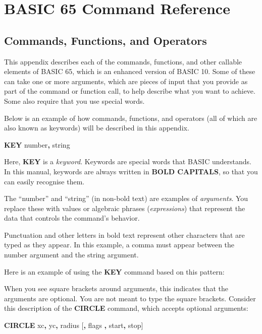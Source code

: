 \hypersetup{bookmarksdepth=2}
\chapter{BASIC 65 Command Reference}
\label{cha:basic-reference}


\section{Commands, Functions, and Operators}

This appendix describes each of the commands, functions, and other callable
elements of BASIC 65, which is an enhanced version of BASIC 10. Some of these
can take one or more arguments, which are pieces of input that you provide as
part of the command or function call, to help describe what you want to achieve.
Some also require that you use special words.

Below is an example of how commands, functions, and operators
(all of which are also known as keywords) will be described in this appendix.

{\bf KEY} number{\bf,} string

Here, {\bf KEY} is a {\em keyword}. Keywords are special words
that BASIC understands. In this manual, keywords are always written in
{\bf BOLD CAPITALS}, so that you can easily recognise them.

The ``number'' and ``string'' (in non-bold text) are examples of
{\em arguments}. You replace these with values or algebraic phrases
({\em expressions}) that represent the data that controls the command's behavior.

Punctuation and other letters in bold text represent other characters that are
typed as they appear. In this example, a comma must appear between the number
argument and the string argument.

Here is an example of using the {\bf KEY} command based on this pattern:


When you see square brackets around arguments, this indicates that the arguments
are optional. You are not meant to type the square brackets. Consider this
description of the {\bf CIRCLE} command, which accepts optional arguments:

{\bf CIRCLE} xc{\bf,} yc{\bf,} radius [{\bf,} flags {\bf,} start{\bf,} stop]

